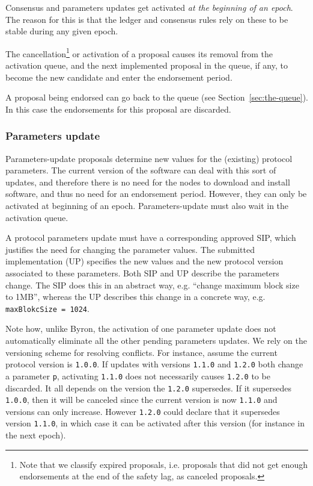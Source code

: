 Consensus and parameters updates get activated \emph{at the beginning of an
	epoch}. The reason for this is that the ledger and consensus rules rely on
these to be stable during any given epoch.

The cancellation\footnote{Note that we classify expired proposals, i.e.
	proposals that did not get enough endorsements at the end of the safety lag,
	as canceled proposals.} or activation of a proposal causes its removal from
the activation queue, and the next implemented proposal in the queue, if any, to
become the new candidate and enter the endorsement period.

A proposal being endorsed can go back to the queue (see
Section~\ref{sec:the-queue}). In this case the endorsements for this proposal
are discarded.

\subsubsection{Parameters update}
\label{sec:parameters-update}

Parameters-update proposals determine new values for the (existing) protocol
parameters. The current version of the software can deal with this sort of
updates, and therefore there is no need for the nodes to download and install
software, and thus no need for an endorsement period. However, they can only be
activated at beginning of an epoch. Parameters-update must also wait in the
activation queue.

A protocol parameters update must have a corresponding approved SIP, which
justifies the need for changing the parameter values. The submitted
implementation (UP) specifies the new values and the new protocol version
associated to these parameters. Both SIP and UP describe the parameters change.
The SIP does this in an abstract way, e.g. ``change maximum block size to 1MB'',
whereas the UP describes this change in a concrete way, e.g.
\texttt{maxBlokcSize = 1024}.

Note how, unlike Byron, the activation of one parameter update does not
automatically eliminate all the other pending parameters updates. We rely on the
versioning scheme for resolving conflicts. For instance, assume the current
protocol version is \texttt{1.0.0}. If updates with versions \texttt{1.1.0} and
\texttt{1.2.0} both change a parameter \texttt{p}, activating \texttt{1.1.0}
does not necessarily causes \texttt{1.2.0} to be discarded. It all depends on
the version the \texttt{1.2.0} supersedes. If it supersedes \texttt{1.0.0}, then
it will be canceled since the current version is now \texttt{1.1.0} and versions
can only increase. However \texttt{1.2.0} could declare that it supersedes
version \texttt{1.1.0}, in which case it can be activated after this version
(for instance in the next epoch).

